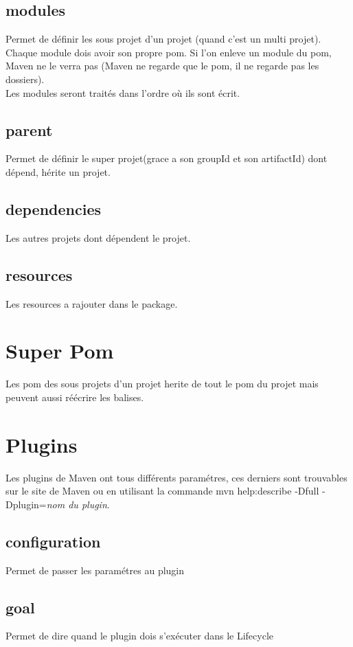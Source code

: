 \documentclass[a4paper,10pt]{article}
\begin{document}
\subsection{modules}
Permet de définir les sous projet d'un projet (quand c'est un multi projet). Chaque module dois avoir son propre pom. Si l'on enleve un module du pom, Maven ne le verra pas (Maven ne regarde que le pom, il ne regarde pas les dossiers).\\
Les modules seront traités dans l'ordre où ils sont écrit.

\subsection{parent}
Permet de définir le super projet(grace a son groupId et son artifactId) dont dépend, hérite un projet.

\subsection{dependencies}
Les autres projets dont dépendent le projet.

\subsection{resources}
Les resources a rajouter dans le package.

\section{Super Pom}
Les pom des sous projets d'un projet herite de tout le pom du projet mais peuvent aussi réécrire les balises.


\section{Plugins}
Les plugins de Maven ont tous différents paramétres, ces derniers sont trouvables sur le site de Maven ou en utilisant la commande mvn help:describe -Dfull -Dplugin=\textit{nom du plugin}.

\subsection{configuration}
Permet de passer les paramétres au plugin

\subsection{goal}
Permet de dire quand le plugin dois s'exécuter dans le Lifecycle
\end{document}
